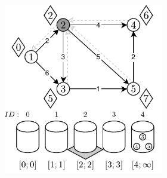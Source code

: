 \begin{figure}[!htbp]
\begin{subfigure}[b]{\textwidth}
\begin{subfigure}[b]{0.32\textwidth}
			\caption{}
			\label{fig:exampleOverflowBucket:b}
		\end{subfigure}
		\hfill
		\begin{subfigure}[b]{0.32\textwidth}
			\includegraphics[width=\textwidth]{Chapter_II/OVERFLOW-BUCKET-Example/c.pdf}
			\caption{}
			\label{fig:exampleOverflowBucket:c}
		\end{subfigure}
		\hfill\null
	\end{subfigure}
	\begin{subfigure}[b]{\textwidth}
			\null\hfill
		\begin{subfigure}[b]{0.32\textwidth}

\end{subfigure}
\end{subfigure}
\end{figure}
